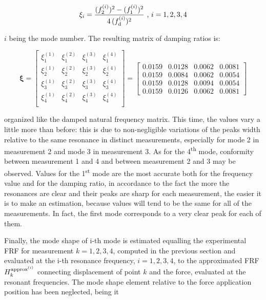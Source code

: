 \documentclass[a4paper,12pt,oneside]{article}
\begin{document}
\[
	\xi_i = \frac{(f^{(i)}_2)^2 - (f^{(i)}_1)^2}{4 \, (f^{(i)}_\textup{d})^2} %
		~ \text{,} ~ i = 1,2,3,4
\]

$ i $ being the mode number. The resulting matrix of damping ratios is:

\[
	\bm{\xi} =	\begin{bmatrix}
								\xi_1^{(1)}	& \xi_1^{(2)} & \xi_1^{(3)}	& \xi_1^{(4)} \\
								\xi_2^{(1)}	& \xi_2^{(2)} & \xi_2^{(3)}	& \xi_2^{(4)} \\
								\xi_3^{(1)}	& \xi_3^{(2)} & \xi_3^{(3)}	& \xi_3^{(4)} \\
								\xi_4^{(1)}	& \xi_4^{(2)} & \xi_4^{(3)}	& \xi_4^{(4)} \\
							\end{bmatrix} = \begin{bmatrix}
																0.0159	& 0.0128	& 0.0062	& 0.0081 \\
																0.0159	& 0.0084	& 0.0062	& 0.0054 \\
																0.0159	& 0.0128	& 0.0094	& 0.0054 \\
																0.0159	& 0.0126	& 0.0062	& 0.0081
															\end{bmatrix}
\]

organized like the damped natural frequency matrix. This time, the values vary a little more than before: this is due to non-negligible variations of the peaks width relative to the same resonance in distinct measurements, especially for mode 2 in measurement 2 and mode 3 in measurement 3. As for the 4\textsuperscript{th} mode, conformity between measurement 1 and 4 and between measurement 2 and 3 may be observed. Values for the 1\textsuperscript{st} mode are the most accurate both for the frequency value and for the damping ratio, in accordance to the fact the more the resonances are %
clear and their peaks are sharp for each measurement, the easier it is to make an estimation, because values will tend to be the same for all of the measurements. In fact, the first mode corresponds to a very clear peak for each of them.

Finally, the mode shape of i-th mode is estimated equalling the experimental FRF for measurement $ k = 1,2,3,4 $, computed in the previous section and evaluated at the i-th resonance frequency, $ i = 1,2,3,4 $, to the approximated FRF $ H^{\textup{approx}^{(i)}}_k $ connecting displacement of point $ k $ and the force, evaluated at the resonant frequencies. The mode shape element relative to the force application position has been neglected, being it 
\end{document}
